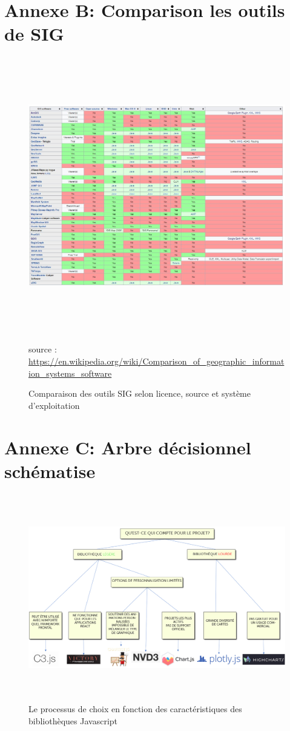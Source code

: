\documentclass[french, a4paper, 12pt]{report}
\begin{document}
\chapter{Annexe B: Comparison les outils de SIG}
\label{annexeB}
\begin{figure}[!htb]
    \centering
    \includegraphics[height=12cm]{images/GIS-tools.jpg}
    \caption{Comparaison des outils SIG selon licence, source et système d'exploitation}
    \scriptsize{\small source : \url{https://en.wikipedia.org/wiki/Comparison_of_geographic_information_systems_software}}
    \label{fig:annexB}
\end{figure}
\chapter{Annexe C: Arbre décisionnel schématise}
\label{annexeC}
\begin{figure}[!htb]
    \centering
    \includegraphics[height=9cm]{images/JSlibrary.jpg}
    \caption{Le processus de choix en fonction des caractéristiques des bibliothèques Javascript}
    \label{fig:annexeC}
\end{figure}
\end{document}
